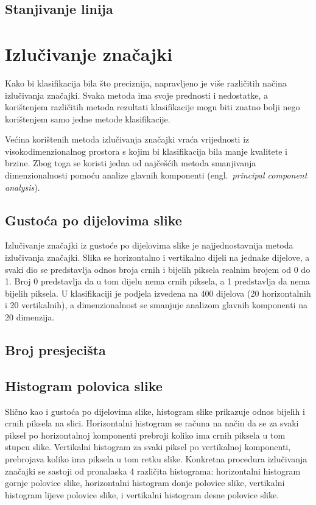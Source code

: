 \documentclass[a4paper,twocolumn,dvipdfm]{article}
\begin{document}
\subsection{Stanjivanje linija}


\section{Izlučivanje značajki}
Kako bi klasifikacija bila što preciznija, napravljeno je više različitih načina
izlučivanja značajki. Svaka metoda ima svoje prednosti i nedostatke, a
korištenjem različitih metoda rezultati klasifikacije mogu biti znatno bolji
nego korištenjem samo jedne metode klasifikacije.

Većina korištenih metoda izlučivanja značajki vraća vrijednosti iz
visokodimenzionalnog prostora s kojim bi klasifikacija bila manje kvalitete i
brzine. Zbog toga se koristi jedna od najčešćih metoda smanjivanja
dimenzionalnosti pomoću analize glavnih komponenti (engl.\ \emph{principal
component analysis}).

\subsection{Gustoća po dijelovima slike}
Izlučivanje značajki iz gustoće po dijelovima slike je najjednostavnija metoda
izlučivanja značajki. Slika se horizontalno i vertikalno dijeli na jednake
dijelove, a svaki dio se predstavlja odnos broja crnih i bijelih piksela realnim
brojem od 0 do 1. Broj 0 predstavlja da u tom dijelu nema crnih piksela, a 1
predstavlja da nema bijelih piksela. U klasifikaciji je podjela izvedena na 400
dijelova (20 horizontalnih i 20 vertikalnih), a dimenzionalnost se smanjuje
analizom glavnih komponenti na 20 dimenzija.

\subsection{Broj presjecišta}

\subsection{Histogram polovica slike}
Slično kao i gustoća po dijelovima slike, histogram slike prikazuje odnos 
bijelih i crnih piksela na slici. Horizontalni histogram se računa na način 
da se za svaki piksel po horizontalnoj komponenti prebroji koliko ima crnih 
piksela u tom stupcu slike. Vertikalni histogram za svaki piksel po vertikalnoj 
komponenti, prebrojava koliko ima piksela u tom retku slike. Konkretna 
procedura izlučivanja značajki se sastoji od pronalaska 4 različita histograma: 
horizontalni histogram gornje polovice slike, horizontalni histogram donje 
polovice slike, vertikalni histogram lijeve polovice slike, i vertikalni 
histogram desne polovice slike.
\end{document}

